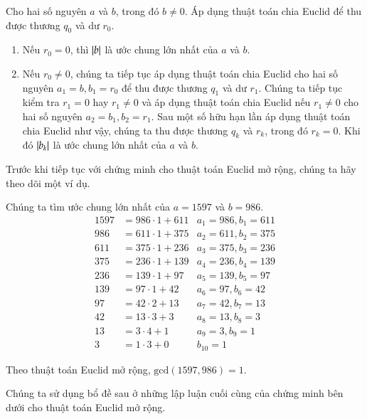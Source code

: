 \begin{theorem}
	Cho hai số nguyên $a$ và $b$, trong đó $b\ne 0$. Áp dụng thuật toán chia Euclid để thu được thương $q_{0}$ và dư $r_{0}$.

	\begin{enumerate}[label={(\roman*)}]
		\item Nếu $r_{0} = 0$, thì $\left\vert{b}\right\vert$ là ước chung lớn nhất của $a$ và $b$.
		\item Nếu $r_{0}\ne 0$, chúng ta tiếp tục áp dụng thuật toán chia Euclid cho hai số nguyên $a_{1} = b, b_{1} = r_{0}$ để thu được thương $q_{1}$ và dư $r_{1}$. Chúng ta tiếp tục kiểm tra $r_{1} = 0$ hay $r_{1}\ne 0$ và áp dụng thuật toán chia Euclid nếu $r_{1}\ne 0$ cho hai số nguyên $a_{2} = b_{1}, b_{2} = r_{1}$. Sau một số hữu hạn lần áp dụng thuật toán chia Euclid như vậy, chúng ta thu được thương $q_{k}$ và $r_{k}$, trong đó $r_{k} = 0$. Khi đó $\left\vert{b_{k}}\right\vert$ là ước chung lớn nhất của $a$ và $b$.
	\end{enumerate}
\end{theorem}

Trước khi tiếp tục với chứng minh cho thuật toán Euclid mở rộng, chúng ta hãy theo dõi một ví dụ.
\begin{example}
	Chúng ta tìm ước chung lớn nhất của $a = 1597$ và $b = 986$.
	\begin{align*}
		1597 & = 986\cdot 1 + 611 & a_{1} = 986, b_{1} = 611 \\
		986  & = 611\cdot 1 + 375 & a_{2} = 611, b_{2} = 375 \\
		611  & = 375\cdot 1 + 236 & a_{3} = 375, b_{3} = 236 \\
		375  & = 236\cdot 1 + 139 & a_{4} = 236, b_{4} = 139 \\
		236  & = 139\cdot 1 + 97  & a_{5} = 139, b_{5} = 97  \\
		139  & = 97\cdot 1 + 42   & a_{6} = 97, b_{6} = 42   \\
		97   & = 42\cdot 2 + 13   & a_{7} = 42, b_{7} = 13   \\
		42   & = 13\cdot 3 + 3    & a_{8} = 13, b_{8} = 3    \\
		13   & = 3\cdot 4 + 1     & a_{9} = 3, b_{9} = 1     \\
		3    & = 1\cdot 3 + 0     & b_{10} = 1
	\end{align*}

	Theo thuật toán Euclid mở rộng, $\text{gcd}(1597, 986) = 1$.
\end{example}

Chúng ta sử dụng bổ đề sau ở những lập luận cuối cùng của chứng minh bên dưới cho thuật toán Euclid mở rộng.

